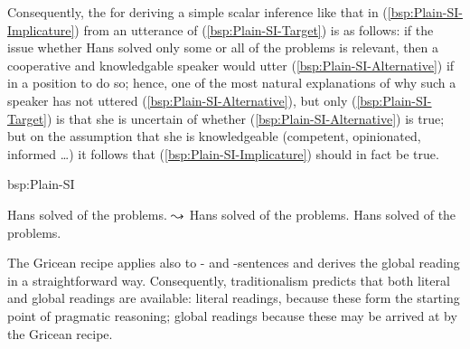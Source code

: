 \documentclass[fleqn,reqno,10pt,draft]{article}
\newcommand{\as}{\acro{as}}
\renewcommand{\es}{\acro{es}}
\begin{document}
Consequently, the 
\citep[c.f.][]{Geurts2010:Quantity-Implic} for deriving a simple
scalar inference like that in (\ref{bsp:Plain-SI-Implicature}) from an
utterance of (\ref{bsp:Plain-SI-Target}) is as follows: if the issue
whether Hans solved only some or all of the problems is relevant, then
a cooperative and knowledgable speaker would utter
(\ref{bsp:Plain-SI-Alternative}) if in a position to do so; hence, one
of the most natural explanations of why such a speaker has not uttered
(\ref{bsp:Plain-SI-Alternative}), but only (\ref{bsp:Plain-SI-Target})
is that she is uncertain of whether (\ref{bsp:Plain-SI-Alternative})
is true; but on the assumption that she is knowledgeable (competent,
opinionated, informed \dots) it follows that
(\ref{bsp:Plain-SI-Implicature}) should in fact be true.

\begin{exer}{bsp:Plain-SI}
  \ex 
    \begin{xlist}
      \ex \label{bsp:Plain-SI-Target} Hans solved  of the problems.
      \ex \label{bsp:Plain-SI-Implicature} $\leadsto$ Hans solved
         of the problems.
      \ex  \label{bsp:Plain-SI-Alternative}  Hans solved  of the problems.
    \end{xlist}
\end{exer}

The Gricean recipe applies also to \as- and \es-sentences and derives
the global reading in a straightforward way. Consequently,
traditionalism predicts that both literal and global readings are
available: literal readings, because these form the starting point of
pragmatic reasoning; global readings because these may be arrived at
by the Gricean recipe. 
\end{document}
